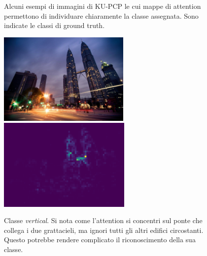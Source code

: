 \begin{figure}[p]
    
    \caption{Alcuni esempi di immagini di KU-PCP le cui mappe di attention permettono di individuare chiaramente la classe assegnata. Sono indicate le classi di ground truth.}
    \label{fig:attention_kupcp}
\end{figure}

\begin{figure}[p]
    \centering
    \includegraphics[height=45mm]{Immagini/conclusioni/vert.jpg}
    \hspace{3mm}
    \includegraphics[height=45mm]{Immagini/conclusioni/vert_att1.png}
    \caption{Classe \textit{vertical}. Si nota come l'attention si concentri sul ponte che collega i due grattacieli, ma ignori tutti gli altri edifici circostanti. Questo potrebbe rendere complicato il riconoscimento della sua classe.}
    \label{fig:failed_attention_kupcp}
\end{figure}

